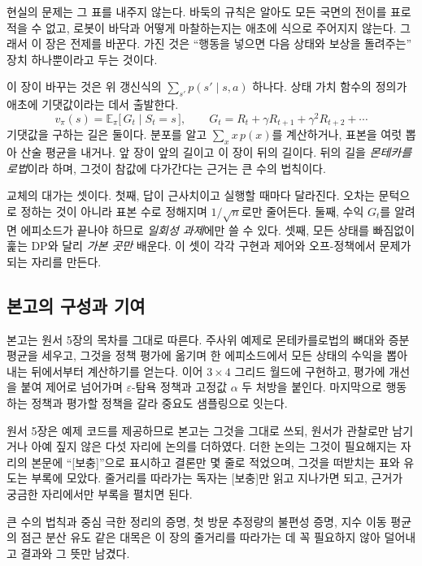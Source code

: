 \documentclass[11pt,a4paper]{article}
\newcommand{\E}{\mathbb{E}}
\begin{document}
현실의 문제는 그 표를 내주지 않는다. 바둑의 규칙은 알아도 모든 국면의 전이를 표로 적을 수 없고,
로봇이 바닥과 어떻게 마찰하는지는 애초에 식으로 주어지지 않는다. 그래서 이 장은 전제를 바꾼다.
가진 것은 ``행동을 넣으면 다음 상태와 보상을 돌려주는'' 장치 하나뿐이라고 두는 것이다.

이 장이 바꾸는 것은 위 갱신식의 $\sum_{s'} p(s'\mid s,a)$ 하나다. 상태 가치 함수의 정의가 애초에
기댓값이라는 데서 출발한다.
\begin{equation*}
  v_\pi(s) = \E_\pi\bigl[\, G_t \mid S_t = s \,\bigr],
  \qquad G_t = R_t + \gamma R_{t+1} + \gamma^2 R_{t+2} + \cdots
\end{equation*}
기댓값을 구하는 길은 둘이다. 분포를 알고 $\sum_x x\,p(x)$를 계산하거나, 표본을 여럿 뽑아 산술 평균을
내거나. 앞 장이 앞의 길이고 이 장이 뒤의 길이다. 뒤의 길을 \emph{몬테카를로법}이라 하며, 그것이
참값에 다가간다는 근거는 큰 수의 법칙이다.

교체의 대가는 셋이다. 첫째, 답이 근사치이고 실행할 때마다 달라진다. 오차는 문턱으로 정하는 것이
아니라 표본 수로 정해지며 $1/\sqrt{n}$로만 줄어든다. 둘째, 수익 $G_t$를 알려면 에피소드가 끝나야
하므로 \emph{일회성 과제}에만 쓸 수 있다. 셋째, 모든 상태를 빠짐없이 훑는 DP와 달리 \emph{가본 곳만}
배운다. 이 셋이 각각 구현과 제어와 오프-정책에서 문제가 되는 자리를 만든다.

\subsection*{본고의 구성과 기여}

본고는 원서 5장의 목차를 그대로 따른다. 주사위 예제로 몬테카를로법의 뼈대와 증분 평균을 세우고,
그것을 정책 평가에 옮기며 한 에피소드에서 모든 상태의 수익을 뽑아내는 뒤에서부터 계산하기를 얻는다.
이어 $3\times4$ 그리드 월드에 구현하고, 평가에 개선을 붙여 제어로 넘어가며 $\varepsilon$-탐욕 정책과
고정값 $\alpha$ 두 처방을 붙인다. 마지막으로 행동하는 정책과 평가할 정책을 갈라 중요도 샘플링으로
잇는다.

원서 5장은 예제 코드를 제공하므로 본고는 그것을 그대로 쓰되, 원서가 관찰로만 남기거나 아예 짚지 않은
다섯 자리에 논의를 더하였다. 더한 논의는 그것이 필요해지는 자리의 본문에 ``[보충]''으로 표시하고
결론만 몇 줄로 적었으며, 그것을 떠받치는 표와 유도는 부록에 모았다. 줄거리를 따라가는 독자는 [보충]만
읽고 지나가면 되고, 근거가 궁금한 자리에서만 부록을 펼치면 된다.

큰 수의 법칙과 중심 극한 정리의 증명, 첫 방문 추정량의 불편성 증명, 지수 이동 평균의 점근 분산
유도 같은 대목은 이 장의 줄거리를 따라가는 데 꼭 필요하지 않아 덜어내고 결과와 그 뜻만 남겼다.
\end{document}
